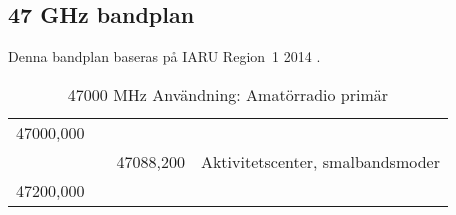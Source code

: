 \subsection{47 GHz bandplan}
\label{47GHzbandplan}
Denna bandplan baseras på IARU Region~1 2014 \cite{IARU1}.

\setlongtables
\begin{longtable}{llll}
\caption{47000 MHz Användning: Amatörradio primär} \\
47000,000 & & & \\
          & & 47088,200 & Aktivitetscenter, smalbandsmoder \\
47200,000 & & & \\
\end{longtable}

\twocolumn

